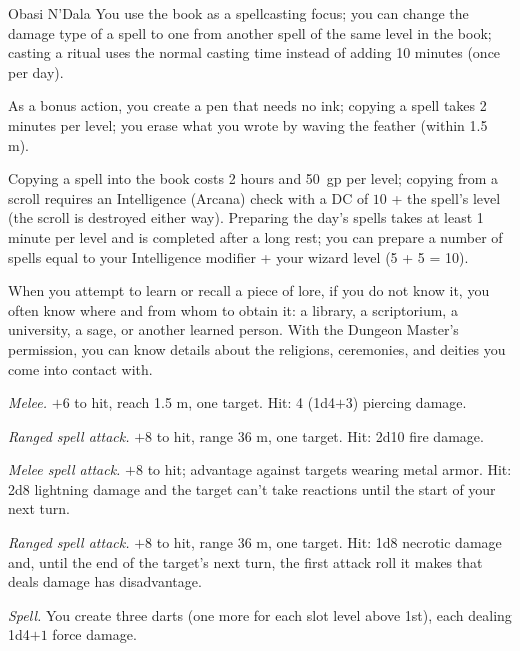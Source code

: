 \documentclass[letterpaper,twocolumn,openany,nodeprecatedcode,justified]{dndbook}
\begin{document}
\begin{DndMonster}{Obasi N'Dala}
  You use the book as a spellcasting focus; you can change the damage
  type of a spell to one from another spell of the same level in the
  book; casting a ritual uses the normal casting time instead of adding
  10 minutes (once per day).

  As a bonus action, you create a pen that needs no ink; copying a spell
  takes 2 minutes per level; you erase what you wrote by waving the
  feather (within 1.5 m).

  Copying a spell into the book costs 2 hours and 50~gp per level;
  copying from a scroll requires an Intelligence (Arcana) check with a
  DC of $10$ + the spell's level (the scroll is destroyed either way).
  Preparing the day's spells takes at least 1 minute per level and is
  completed after a long rest; you can prepare a number of spells equal
  to your Intelligence modifier + your wizard level (5 + 5 = 10).

  When you attempt to learn or recall a piece of lore, if you do not
  know it, you often know where and from whom to obtain it: a library,
  a scriptorium, a university, a sage, or another learned person. With
  the Dungeon Master's permission, you can know details about the
  religions, ceremonies, and deities you come into contact with.


  \textit{Melee.} $+6$ to hit, reach 1.5 m, one target. Hit: 4 (1d4$+3$)
  piercing damage.

  \textit{Ranged spell attack.} $+8$ to hit, range 36 m, one target.
  Hit: 2d10 fire damage.

  \textit{Melee spell attack.} $+8$ to hit; advantage against targets
  wearing metal armor. Hit: 2d8 lightning damage and the target can't
  take reactions until the start of your next turn.

  \textit{Ranged spell attack.} $+8$ to hit, range 36 m, one target.
  Hit: 1d8 necrotic damage and, until the end of the target's next turn,
  the first attack roll it makes that deals damage has disadvantage.

  \textit{Spell.} You create three darts (one more for each slot level
  above 1st), each dealing 1d4$+1$ force damage.


\end{DndMonster}
\end{document}
